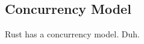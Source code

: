 

\subsection{Concurrency Model} %
\label{ssub:concurrency_model}

Rust has a concurrency model. Duh.




